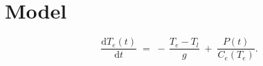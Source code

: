 \documentclass[
	parskip=half,
	a4paper,
]{scrarticle}
\begin{document}
\section{Model}
\begin{equation}
    \frac{\mathrm d T_e(t)}{\mathrm d t}
    \;=\;
    -\,\frac{T_e - T_l}{g}
    \;+\;
    \frac{P(t)}{C_e(T_e)}.
    \label{eq:Te}
\end{equation}

\end{document}

